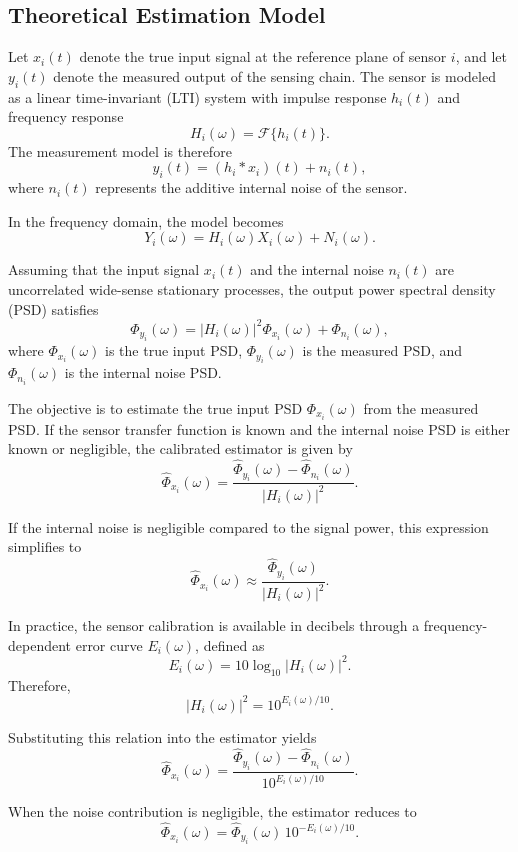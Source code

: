 \documentclass[11pt]{article}
\begin{document}
\subsection{Theoretical Estimation Model}

Let $x_i(t)$ denote the true input signal at the reference plane of sensor $i$, and let $y_i(t)$ denote the measured output of the sensing chain. The sensor is modeled as a linear time-invariant (LTI) system with impulse response $h_i(t)$ and frequency response
\[
H_i(\omega) = \mathcal{F}\{h_i(t)\}.
\]
The measurement model is therefore
\[
y_i(t) = (h_i * x_i)(t) + n_i(t),
\]
where $n_i(t)$ represents the additive internal noise of the sensor.

In the frequency domain, the model becomes
\[
Y_i(\omega) = H_i(\omega) X_i(\omega) + N_i(\omega).
\]

Assuming that the input signal $x_i(t)$ and the internal noise $n_i(t)$ are uncorrelated wide-sense stationary processes, the output power spectral density (PSD) satisfies
\[
\Phi_{y_i}(\omega) = |H_i(\omega)|^2 \Phi_{x_i}(\omega) + \Phi_{n_i}(\omega),
\]
where $\Phi_{x_i}(\omega)$ is the true input PSD, $\Phi_{y_i}(\omega)$ is the measured PSD, and $\Phi_{n_i}(\omega)$ is the internal noise PSD.

The objective is to estimate the true input PSD $\Phi_{x_i}(\omega)$ from the measured PSD. If the sensor transfer function is known and the internal noise PSD is either known or negligible, the calibrated estimator is given by
\[
\widehat{\Phi}_{x_i}(\omega)
=
\frac{\widehat{\Phi}_{y_i}(\omega)-\widehat{\Phi}_{n_i}(\omega)}
{|H_i(\omega)|^2}.
\]

If the internal noise is negligible compared to the signal power, this expression simplifies to
\[
\widehat{\Phi}_{x_i}(\omega)
\approx
\frac{\widehat{\Phi}_{y_i}(\omega)}
{|H_i(\omega)|^2}.
\]

In practice, the sensor calibration is available in decibels through a frequency-dependent error curve $E_i(\omega)$, defined as
\[
E_i(\omega) = 10 \log_{10} |H_i(\omega)|^2.
\]
Therefore,
\[
|H_i(\omega)|^2 = 10^{E_i(\omega)/10}.
\]

Substituting this relation into the estimator yields
\[
\widehat{\Phi}_{x_i}(\omega)
=
\frac{\widehat{\Phi}_{y_i}(\omega)-\widehat{\Phi}_{n_i}(\omega)}
{10^{E_i(\omega)/10}}.
\]

When the noise contribution is negligible, the estimator reduces to
\[
\widehat{\Phi}_{x_i}(\omega)
=
\widehat{\Phi}_{y_i}(\omega)\,10^{-E_i(\omega)/10}.
\]
\end{document}
